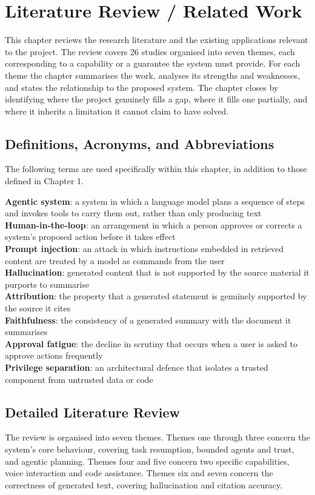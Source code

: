 \documentclass{FastFyp}
\begin{document}
\chapter{Literature Review / Related Work}
This chapter reviews the research literature and the existing applications relevant to the project. The review covers 26 studies organised into seven themes, each corresponding to a capability or a guarantee the system must provide. For each theme the chapter summarises the work, analyses its strengths and weaknesses, and states the relationship to the proposed system. The chapter closes by identifying where the project genuinely fills a gap, where it fills one partially, and where it inherits a limitation it cannot claim to have solved.

\section{Definitions, Acronyms, and Abbreviations}
The following terms are used specifically within this chapter, in addition to those defined in Chapter 1.

\textbf{Agentic system}: a system in which a language model plans a sequence of steps and invokes tools to carry them out, rather than only producing text\\
\textbf{Human-in-the-loop}: an arrangement in which a person approves or corrects a system's proposed action before it takes effect\\
\textbf{Prompt injection}: an attack in which instructions embedded in retrieved content are treated by a model as commands from the user\\
\textbf{Hallucination}: generated content that is not supported by the source material it purports to summarise\\
\textbf{Attribution}: the property that a generated statement is genuinely supported by the source it cites\\
\textbf{Faithfulness}: the consistency of a generated summary with the document it summarises\\
\textbf{Approval fatigue}: the decline in scrutiny that occurs when a user is asked to approve actions frequently\\
\textbf{Privilege separation}: an architectural defence that isolates a trusted component from untrusted data or code

\section{Detailed Literature Review}
The review is organised into seven themes. Themes one through three concern the system's core behaviour, covering task resumption, bounded agents and trust, and agentic planning. Themes four and five concern two specific capabilities, voice interaction and code assistance. Themes six and seven concern the correctness of generated text, covering hallucination and citation accuracy.
\end{document}
